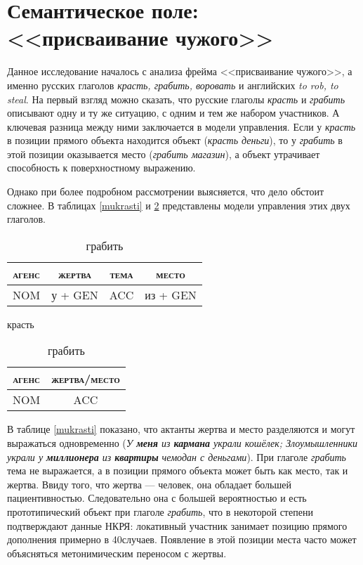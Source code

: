 \section{Семантическое поле: <<присваивание чужого>>} \label{grabit}
Данное исследование началось с анализа фрейма <<присваивание чужого>>, а именно русских глаголов \textit{красть, грабить, воровать} и английских \textit{to rob, to steal}. На первый взгляд можно сказать, что русские глаголы \textit{красть} и \textit{грабить} описывают одну и ту же ситуацию, с одним и тем же набором участников. А ключевая разница между ними заключается в модели управления. Если у \textit{красть} в позиции прямого объекта находится объект (\textit{красть деньги}), то у \textit{грабить} в этой позиции оказывается место (\textit{грабить магазин}), а объект утрачивает способность к поверхностному выражению. 

\par Однако при более подробном рассмотрении выясняется, что дело обстоит сложнее. В таблицах \ref{mukrasti} и \ref{mugrabiti} представлены модели управления этих двух глаголов. 


\begin{table}[H]
\vspace{+10pt}
\centering
\parbox{.49\linewidth}{
\centering
\begin{tabular}{c|c|c|c}
\hline
\textsc{агенс}&\textsc{жертва}&\textsc{тема}&\textsc{место}\\
\hline
NOM& у + GEN& ACC & из + GEN\\
\hline

\end{tabular}
\caption{красть}
\label{mukrasti}
}
\parbox{.49\linewidth}{
\centering
\begin{tabular}{c|c}
\hline
\textsc{агенс}&\textsc{жертва/место}\\
\hline
NOM&ACC\\
\hline
\end{tabular}
\caption{грабить}
\label{mugrabiti}
}
\end{table}

В таблице \ref{mukrasti} показано, что актанты жертва и место разделяются и могут выражаться одновременно (\textit{У \textbf{меня} из \textbf{кармана} украли кошёлек; Злоумышленники украли у \textbf{миллионера} из \textbf{квартиры} чемодан с деньгами}). При глаголе \textit{грабить} тема не выражается, а в позиции прямого объекта может быть как место, так и жертва. Ввиду того, что жертва --- человек, она обладает большей пациентивностью. Следовательно она с большей вероятностью и есть прототипический объект при глаголе \textit{грабить}, что в некоторой степени подтверждают данные НКРЯ: локативный участник занимает позицию прямого дополнения примерно в 40\percent случаев. Появление в этой позиции места часто может объясняться метонимическим переносом с жертвы.

